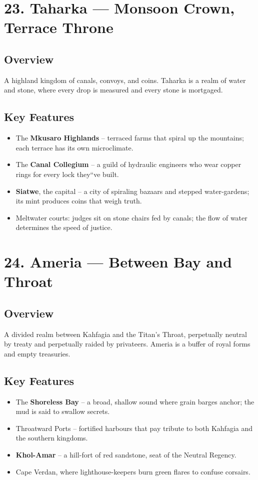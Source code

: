 \documentclass[11pt]{article}
\begin{document}
\section*{23. Taharka --- Monsoon Crown, Terrace Throne}

\subsection*{Overview}
A highland kingdom of canals, convoys, and coins. Taharka is a realm of water and stone, where every drop is measured and every stone is mortgaged.

\subsection*{Key Features}
\begin{itemize}[leftmargin=*]
    \item The \textbf{Mkusaro Highlands} -- terraced farms that spiral up the mountains; each terrace has its own microclimate.
    \item The \textbf{Canal Collegium} -- a guild of hydraulic engineers who wear copper rings for every lock they``ve built.
    \item \textbf{Siatwe}, the capital -- a city of spiraling bazaars and stepped water-gardens; its mint produces coins that weigh truth.
    \item Meltwater courts: judges sit on stone chairs fed by canals; the flow of water determines the speed of justice.
\end{itemize}

\section*{24. Ameria --- Between Bay and Throat}

\subsection*{Overview}
A divided realm between Kahfagia and the Titan's Throat, perpetually neutral by treaty and perpetually raided by privateers. Ameria is a buffer of royal forms and empty treasuries.

\subsection*{Key Features}
\begin{itemize}[leftmargin=*]
    \item The \textbf{Shoreless Bay} -- a broad, shallow sound where grain barges anchor; the mud is said to swallow secrets.
    \item Throatward Ports -- fortified harbours that pay tribute to both Kahfagia and the southern kingdoms.
    \item \textbf{Khol-Amar} -- a hill-fort of red sandstone, seat of the Neutral Regency.
    \item Cape Verdan, where lighthouse-keepers burn green flares to confuse corsairs.
\end{itemize}
\end{document}
